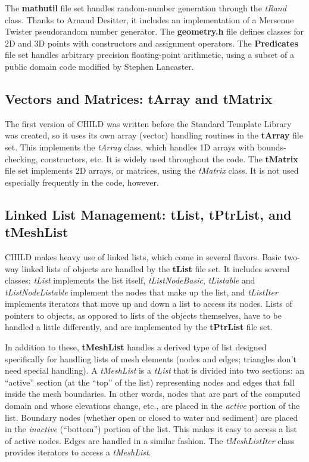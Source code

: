 \documentclass[12pt]{article}
\begin{document}
The {\bf mathutil} file set handles random-number generation through the 
{\em tRand} class. Thanks to Arnaud Desitter, it includes an implementation of 
a Mersenne Twister pseudorandom number generator. The {\bf geometry.h} file 
defines classes for 2D and 3D points with constructors and assignment 
operators. The {\bf Predicates} file set handles arbitrary precision 
floating-point arithmetic, using a subset of a public domain code modified by 
Stephen Lancaster.

\subsection{Vectors and Matrices: tArray and tMatrix}

The first version of CHILD was written before the Standard Template Library 
was created, so it uses its own array (vector) handling routines in the 
{\bf tArray} file set. This implements the {\em tArray} class, which handles 
1D arrays with bounds-checking, constructors, etc. It is widely used 
throughout the code. The {\bf tMatrix} file set implements 2D arrays, or 
matrices, using the {\em tMatrix} class. It is not used especially frequently 
in the code, however.

\subsection{Linked List Management: tList, tPtrList, and tMeshList}

CHILD makes heavy use of linked lists, which come in several flavors. Basic 
two-way linked lists of objects are handled by the {\bf tList} file set. It 
includes several classes: {\em tList} implements the list itself, 
{\em tListNodeBasic}, {\em tListable} and {\em tListNodeListable} implement 
the nodes that make up the list, and {\em tListIter} implements iterators that 
move up and down a list to access its nodes. Lists of pointers to objects, as 
opposed to lists of the objects themselves, have to be handled a little 
differently, and are implemented by the {\bf tPtrList} file set.

In addition to these, {\bf tMeshList} handles a derived type of list designed 
specifically for handling lists of mesh elements (nodes and edges; triangles
don't need special handling). A 
{\em tMeshList} is a {\em tList} that is divided into two sections: an 
``active'' section (at the ``top'' of the list) representing nodes and edges 
that fall inside the mesh boundaries. In other words, nodes that are part of 
the computed domain and whose elevations change, etc., are placed in the 
{\em active} portion of the list. Boundary nodes (whether open or closed to 
water and sediment) are placed in the {\em inactive} (``bottom'') portion of 
the list. This makes it easy to access a list of active nodes. Edges are 
handled in a similar fashion. The {\em tMeshListIter} class provides 
iterators to access a {\em tMeshList}.
\end{document}
